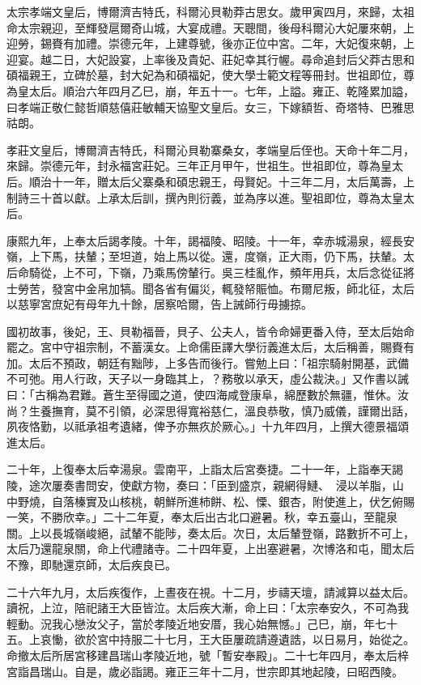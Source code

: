 \begin{pinyinscope}
太宗孝端文皇后，博爾濟吉特氏，科爾沁貝勒莽古思女。歲甲寅四月，來歸，太祖命太宗親迎，至輝發扈爾奇山城，大宴成禮。天聰間，後母科爾沁大妃屢來朝，上迎勞，錫賚有加禮。崇德元年，上建尊號，後亦正位中宮。二年，大妃復來朝，上迎宴。越二日，大妃設宴，上率後及貴妃、莊妃幸其行幄。尋命追封后父莽古思和碩福親王，立碑於墓，封大妃為和碩福妃，使大學士範文程等冊封。世祖即位，尊為皇太后。順治六年四月乙巳，崩，年五十一。七年，上謚。雍正、乾隆累加謚，曰孝端正敬仁懿哲順慈僖莊敏輔天協聖文皇后。女三，下嫁額哲、奇塔特、巴雅思祜朗。

孝莊文皇后，博爾濟吉特氏，科爾沁貝勒寨桑女，孝端皇后侄也。天命十年二月，來歸。崇德元年，封永福宮莊妃。三年正月甲午，世祖生。世祖即位，尊為皇太后。順治十一年，贈太后父寨桑和碩忠親王，母賢妃。十三年二月，太后萬壽，上制詩三十首以獻。上承太后訓，撰內則衍義，並為序以進。聖祖即位，尊為太皇太后。

康熙九年，上奉太后謁孝陵。十年，謁福陵、昭陵。十一年，幸赤城湯泉，經長安嶺，上下馬，扶輦；至坦道，始上馬以從。還，度嶺，正大雨，仍下馬，扶輦。太后命騎從，上不可，下嶺，乃乘馬傍輦行。吳三桂亂作，頻年用兵，太后念從征將士勞苦，發宮中金帛加犒。聞各省有偏災，輒發帑賑恤。布爾尼叛，師北征，太后以慈寧宮庶妃有母年九十餘，居察哈爾，告上誡師行毋擄掠。

國初故事，後妃，王、貝勒福晉，貝子、公夫人，皆令命婦更番入侍，至太后始命罷之。宮中守祖宗制，不蓄漢女。上命儒臣譯大學衍義進太后，太后稱善，賜賚有加。太后不預政，朝廷有黜陟，上多告而後行。嘗勉上曰：「祖宗騎射開基，武備不可弛。用人行政，天子以一身臨其上，？務敬以承天，虛公裁決。」又作書以誡曰：「古稱為君難。蒼生至得國之道，使四海咸登康阜，綿歷數於無疆，惟休。汝尚？生養撫育，莫不引領，必深思得寬裕慈仁，溫良恭敬，慎乃威儀，謹爾出話，夙夜恪勤，以祗承祖考遺緒，俾予亦無疚於厥心。」十九年四月，上撰大德景福頌進太后。

二十年，上復奉太后幸湯泉。雲南平，上詣太后宮奏捷。二十一年，上詣奉天謁陵，途次屢奏書問安，使獻方物，奏曰：「臣到盛京，親網得鰱、，浸以羊脂，山中野燒，自落榛實及山核桃，朝鮮所進柿餅、松、慄、銀杏，附使進上，伏乞俯賜一笑，不勝欣幸。」二十二年夏，奉太后出古北口避暑。秋，幸五臺山，至龍泉關。上以長城嶺峻絕，試輦不能陟，奏太后。次日，太后輦登嶺，路數折不可上，太后乃還龍泉關，命上代禮諸寺。二十四年夏，上出塞避暑，次博洛和屯，聞太后不豫，即馳還京師，太后疾良已。

二十六年九月，太后疾復作，上晝夜在視。十二月，步禱天壇，請減算以益太后。讀祝，上泣，陪祀諸王大臣皆泣。太后疾大漸，命上曰：「太宗奉安久，不可為我輕動。況我心戀汝父子，當於孝陵近地安厝，我心始無憾。」己巳，崩，年七十五。上哀慟，欲於宮中持服二十七月，王大臣屢疏請遵遺誥，以日易月，始從之。命撤太后所居宮移建昌瑞山孝陵近地，號「暫安奉殿」。二十七年四月，奉太后梓宮詣昌瑞山。自是，歲必詣謁。雍正三年十二月，世宗即其地起陵，曰昭西陵。


\end{pinyinscope}
